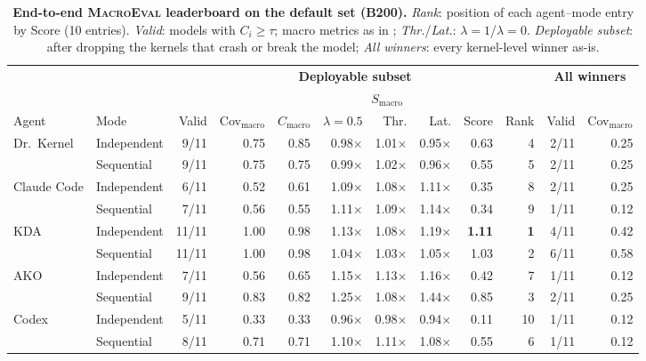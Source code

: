 \begin{table}[t]
  \centering
  \caption{\textbf{End-to-end \textsc{MacroEval} leaderboard on the default set (B200).} \emph{Rank}: position of each agent--mode entry by Score (10 entries).
  \emph{Valid}: models with $C_i \geq \tau$; macro metrics as in ; \emph{Thr.}/\emph{Lat.}: $\lambda{=}1$/$\lambda{=}0$.
  \emph{Deployable subset}: after dropping the kernels that crash or break the model; \emph{All winners}: every kernel-level winner as-is.}
  \label{fastkernels:tab:e2e-macroeval}
  \small
  \setlength{\tabcolsep}{3pt}
  \begin{adjustbox}{max width=\linewidth}
\begin{tabular}{@{}ll rrr rrr rr rr@{}}
\toprule
 & & \multicolumn{8}{c}{\textbf{Deployable subset}} & \multicolumn{2}{c}{\textbf{All winners}} \\
\cmidrule(lr){3-10}\cmidrule(lr){11-12}
 & & & & & \multicolumn{3}{c}{$S_{\mathrm{macro}}$} & & & & \\
\cmidrule(lr){6-8}
Agent & Mode & Valid & Cov$_{\mathrm{macro}}$ & $C_{\mathrm{macro}}$ & $\lambda{=}0.5$ & Thr. & Lat. & Score & Rank & Valid & Cov$_{\mathrm{macro}}$ \\
\midrule
\multirow{2}{*}{Dr.~Kernel} & Independent & 9/11 & 0.75 & 0.85 & 0.98$\times$ & 1.01$\times$ & 0.95$\times$ & 0.63 & 4 & 2/11 & 0.25 \\
 & Sequential & 9/11 & 0.75 & 0.75 & 0.99$\times$ & 1.02$\times$ & 0.96$\times$ & 0.55 & 5 & 2/11 & 0.25 \\
\midrule
\multirow{2}{*}{Claude Code} & Independent & 6/11 & 0.52 & 0.61 & 1.09$\times$ & 1.08$\times$ & 1.11$\times$ & 0.35 & 8 & 2/11 & 0.25 \\
 & Sequential & 7/11 & 0.56 & 0.55 & 1.11$\times$ & 1.09$\times$ & 1.14$\times$ & 0.34 & 9 & 1/11 & 0.12 \\
\midrule
\multirow{2}{*}{KDA} & Independent & 11/11 & 1.00 & 0.98 & 1.13$\times$ & 1.08$\times$ & 1.19$\times$ & \textbf{1.11} & \textbf{1} & 4/11 & 0.42 \\
 & Sequential & 11/11 & 1.00 & 0.98 & 1.04$\times$ & 1.03$\times$ & 1.05$\times$ & 1.03 & 2 & 6/11 & 0.58 \\
\midrule
\multirow{2}{*}{AKO} & Independent & 7/11 & 0.56 & 0.65 & 1.15$\times$ & 1.13$\times$ & 1.16$\times$ & 0.42 & 7 & 1/11 & 0.12 \\
 & Sequential & 9/11 & 0.83 & 0.82 & 1.25$\times$ & 1.08$\times$ & 1.44$\times$ & 0.85 & 3 & 2/11 & 0.25 \\
\midrule
\multirow{2}{*}{Codex} & Independent & 5/11 & 0.33 & 0.33 & 0.96$\times$ & 0.98$\times$ & 0.94$\times$ & 0.11 & 10 & 1/11 & 0.12 \\
 & Sequential & 8/11 & 0.71 & 0.71 & 1.10$\times$ & 1.11$\times$ & 1.08$\times$ & 0.55 & 6 & 1/11 & 0.12 \\
\bottomrule
\end{tabular}
  \end{adjustbox}
\end{table}

